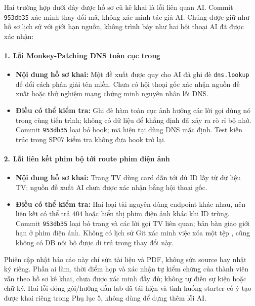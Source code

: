 \documentclass[12pt,a4paper]{extarticle}
\begin{document}
Hai trường hợp dưới đây được hồ sơ cũ kê khai là lỗi liên quan AI. Commit \texttt{953db35} xác minh thay đổi mã, không xác minh tác giả AI. Chúng được giữ như hồ sơ lịch sử với giới hạn nguồn, không trình bày như hai hội thoại AI đã được xác nhận:

\paragraph*{1. Lỗi Monkey-Patching DNS toàn cục trong }
\begin{itemize}[noitemsep]
    \item \textbf{Nội dung hồ sơ khai:} Một đề xuất được quy cho AI đã ghi đè \texttt{dns.lookup} để đổi cách phân giải tên miền. Chưa có hội thoại gốc xác nhận nguồn đề xuất hoặc thử nghiệm mạng chứng minh nguyên nhân lỗi DNS.
    \item \textbf{Điều có thể kiểm tra:} Ghi đè hàm toàn cục ảnh hưởng các lời gọi dùng nó trong cùng tiến trình; không có dữ liệu để khẳng định đã xảy ra rò rỉ bộ nhớ. Commit \texttt{953db35} loại bỏ hook; mã hiện tại dùng DNS mặc định. Test kiến trúc trong SP07 kiểm tra không đưa hook trở lại.
\end{itemize}

\paragraph*{2. Lỗi liên kết phim bộ tới route phim điện ảnh}
\begin{itemize}[noitemsep]
    \item \textbf{Nội dung hồ sơ khai:} Trang TV dùng card dẫn tới  dù ID lấy từ dữ liệu TV; nguồn đề xuất AI chưa được xác nhận bằng hội thoại gốc.
    \item \textbf{Điều có thể kiểm tra:} Hai loại tài nguyên dùng endpoint khác nhau, nên liên kết có thể trả 404 hoặc hiển thị phim điện ảnh khác khi ID trùng. Commit \texttt{953db35} loại bỏ trang  và các lời gọi TV liên quan; bản bàn giao giới hạn ở phim điện ảnh. Không có lịch sử Git xác minh việc xóa một tệp , cũng không có DB nội bộ được di trú trong thay đổi này.
\end{itemize}

Phiên cập nhật báo cáo này chỉ sửa tài liệu và PDF, không sửa source hay nhật ký riêng. Phần ai làm, thời điểm họp và xác nhận tự kiểm chứng của thành viên vẫn theo hồ sơ kê khai, chưa được xác minh đầy đủ; không tự điền sự kiện hoặc chữ ký. Hai lỗi đóng gói/hướng dẫn lab đã tái hiện và tình huống starter cố ý tạo được khai riêng trong Phụ lục 5, không dùng để dựng thêm lỗi AI.
\end{document}

